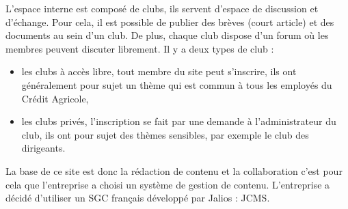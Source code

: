 \documentclass[12pt,a4paper]{article}
\begin{document}
L'espace interne est composé de clubs, ils servent d'espace de discussion et d'échange. Pour cela, il est possible de publier des brèves (court article) et des documents au sein d'un club. De plus, chaque club dispose d'un forum où les membres peuvent discuter librement. Il y a deux types de club : 
\begin{itemize}
\item les clubs à accès libre, tout membre du site peut s'inscrire, ils ont généralement pour sujet un thème qui est commun à tous les employés du Crédit Agricole,
\item les clubs privés, l'inscription se fait par une demande à l'administrateur du club, ils ont pour sujet des thèmes sensibles, par exemple le club des dirigeants.
\end{itemize} \par 
\bigskip
La base de ce site est donc la rédaction de contenu et la collaboration c'est pour cela que l'entreprise a choisi un système de gestion de contenu. L'entreprise a décidé d'utiliser un SGC français développé par Jalios : \gls{JCMS}.
\end{document}
